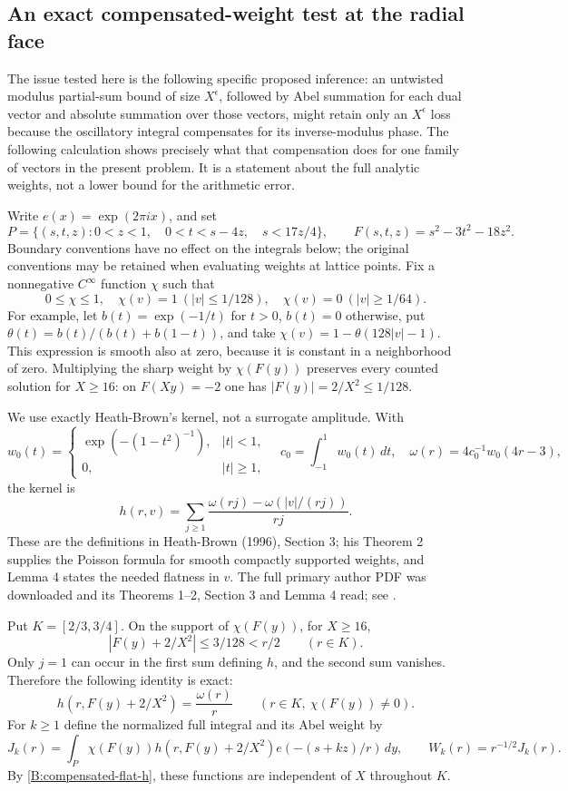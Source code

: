 \subsection*{An exact compensated-weight test at the radial face}

The issue tested here is the following specific proposed inference: an
untwisted modulus partial-sum bound of size $X^\epsilon$, followed by
Abel summation for each dual vector and absolute summation over those
vectors, might retain only an $X^\epsilon$ loss because the oscillatory
integral compensates for its inverse-modulus phase.  The following
calculation shows precisely what that compensation does for one
family of vectors in the present problem.  It is a statement about
the full analytic weights, not a lower bound for the arithmetic error.

Write $e(x)=\exp(2\pi i x)$, and set
\[
 P=\{(s,t,z):0<z<1,\quad0<t<s-4z,\quad s<17z/4\},\qquad
 F(s,t,z)=s^2-3t^2-18z^2.
\]
Boundary conventions have no effect on the integrals below; the
original conventions may be retained when evaluating weights at
lattice points.  Fix a nonnegative $C^\infty$ function $\chi$ such that
\[
 0\leq\chi\leq1,\quad \chi(v)=1\ (|v|\leq1/128),\quad
 \chi(v)=0\ (|v|\geq1/64).
\]
For example, let $b(t)=\exp(-1/t)$ for $t>0$, $b(t)=0$ otherwise,
put $\theta(t)=b(t)/(b(t)+b(1-t))$, and take
$\chi(v)=1-\theta(128|v|-1)$.  This expression is smooth also at zero,
because it is constant in a neighborhood of zero.  Multiplying the
sharp weight by $\chi(F(y))$ preserves every counted solution for
$X\geq16$: on $F(Xy)=-2$ one has
$|F(y)|=2/X^2\leq1/128$.

We use exactly Heath-Brown's kernel, not a surrogate amplitude.
With
\[
 w_0(t)=\begin{cases}\exp(-(1-t^2)^{-1}),&|t|<1,\\0,&|t|\geq1,
 \end{cases}\quad
 c_0=\int_{-1}^1w_0(t)\,dt,\quad
 \omega(r)=4c_0^{-1}w_0(4r-3),
\]
the kernel is
\[
 h(r,v)=\sum_{j\geq1}\frac{\omega(rj)-\omega(|v|/(rj))}{rj}.
\]
These are the definitions in Heath-Brown (1996), Section 3; his
Theorem 2 supplies the Poisson formula for smooth compactly supported
weights, and Lemma 4 states the needed flatness in $v$.
The full primary author PDF was downloaded and its Theorems 1--2,
Section 3 and Lemma 4 read; see \cite{A5HeathBrown1996}.

Put $K=[2/3,3/4]$.  On the support of $\chi(F(y))$, for $X\geq16$,
\[
 |F(y)+2/X^2|\leq3/128<r/2\qquad(r\in K).
\]
Only $j=1$ can occur in the first sum defining $h$, and the second
sum vanishes.  Therefore the following identity is exact:
\begin{equation}\label{B:compensated-flat-h}
 h(r,F(y)+2/X^2)=\frac{\omega(r)}r\qquad
 (r\in K,\ \chi(F(y))\ne0).
\end{equation}
For $k\geq1$ define the normalized full integral and its Abel weight by
\[
 J_k(r)=\int_P\chi(F(y))h(r,F(y)+2/X^2)
                 e(-(s+kz)/r)\,dy,\qquad
 W_k(r)=r^{-1/2}J_k(r).
\]
By \eqref{B:compensated-flat-h}, these functions are independent of
$X$ throughout $K$.


